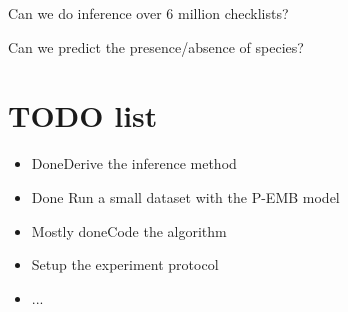 \documentclass{article}
\begin{document}
Can we do inference over 6 million checklists?

Can we predict the presence/absence of species?

\section{TODO list}
\begin{itemize}
\item \lbrack Done\rbrack Derive the inference method
\item \lbrack Done\rbrack
Run a small dataset with the P-EMB model
\item \lbrack Mostly done\rbrack Code the algorithm
\item Setup the experiment protocol
\item ...
\end{itemize}
\end{document}
